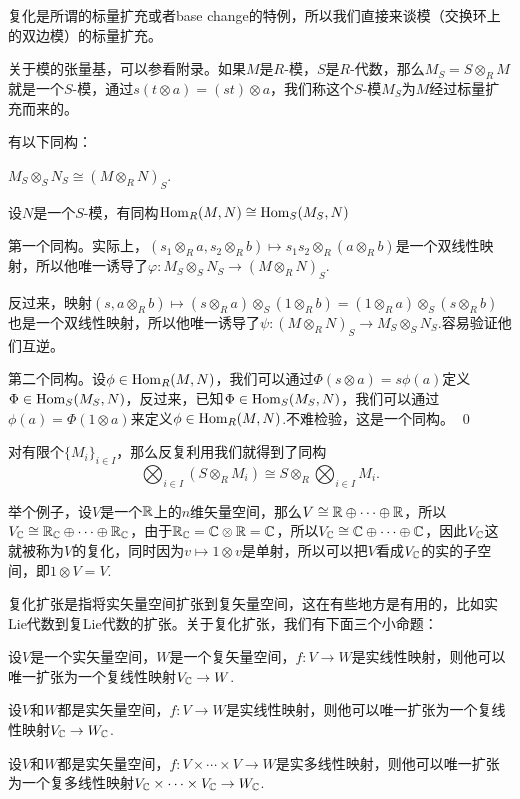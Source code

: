 复化是所谓的标量扩充或者base change的特例，所以我们直接来谈模（交换环上的双边模）的标量扩充。

\para 关于模的张量基，可以参看附录。如果$M$是$R$-模，$S$是$R$-代数，那么$M_S=S\otimes_R M$就是一个$S$-模，通过$s(t\otimes a)=(st)\otimes a$，我们称这个$S$-模$M_S$为$M$经过标量扩充而来的。

\lem 有以下同构：

 $M_S\otimes_S N_S\cong (M\otimes_R N)_S$.

 设$N$是一个$S$-模，有同构$\operatorname{Hom}_R(M,N)\cong \operatorname{Hom}_S(M_S,N)$

\proof 第一个同构。实际上，$(s_1\otimes_R a,s_2\otimes_R b)\mapsto s_1s_2\otimes_R(a\otimes_R b)$是一个双线性映射，所以他唯一诱导了$\varphi:M_S\otimes_S N_S\to (M\otimes_R N)_S$.

反过来，映射$(s,a\otimes_R b)\mapsto (s\otimes_R a)\otimes_S (1\otimes_R b)=(1\otimes_R a)\otimes_S (s\otimes_R b)$也是一个双线性映射，所以他唯一诱导了$\psi:(M\otimes_R N)_S\to M_S\otimes_S N_S$.容易验证他们互逆。

第二个同构。设$\phi\in \operatorname{Hom}_R(M,N)$，我们可以通过$\Phi(s\otimes a)=s\phi(a)$定义$\Phi\in \operatorname{Hom}_S(M_S,N)$，反过来，已知$\Phi\in \operatorname{Hom}_S(M_S,N)$，我们可以通过$\phi(a)=\Phi(1\otimes a)$来定义$\phi\in \operatorname{Hom}_R(M,N)$.不难检验，这是一个同构。 \qed

对有限个$\{M_i\}_{i\in I}$，那么反复利用我们就得到了同构
\[
\bigotimes_{i\in I} \left(S\otimes_RM_i\right)\cong S\otimes_R\bigotimes_{i\in I} M_i.
\]

\para 举个例子，设$V$是一个$\mathbb{R}$上的$n$维矢量空间，那么$V\cong \mathbb{R}\oplus \cdots \oplus \mathbb{R}$，所以$V_{\mathbb{C}}\cong \mathbb{R}_{\mathbb{C}}\oplus \cdots \oplus \mathbb{R}_{\mathbb{C}}$，由于$\mathbb{R}_{\mathbb{C}}=\mathbb{C}\otimes \mathbb{R}=\mathbb{C}$，所以$V_{\mathbb{C}}\cong \mathbb{C}\oplus \cdots \oplus \mathbb{C}$，因此$V_{\mathbb{C}}$这就被称为$V$的复化，同时因为$v\mapsto 1\otimes v$是单射，所以可以把$V$看成$V_{\mathbb{C}}$的实的子空间，即$1\otimes V=V$.

\para 复化扩张是指将实矢量空间扩张到复矢量空间，这在有些地方是有用的，比如实Lie代数到复Lie代数的扩张。关于复化扩张，我们有下面三个小命题：

设$V$是一个实矢量空间，$W$是一个复矢量空间，$f:V\to W$是实线性映射，则他可以唯一扩张为一个复线性映射$V_{\mathbb{C}}\to W$.

设$V$和$W$都是实矢量空间，$f:V\to W$是实线性映射，则他可以唯一扩张为一个复线性映射$V_{\mathbb{C}}\to W_{\mathbb{C}}$.

设$V$和$W$都是实矢量空间，$f:V\times\cdots\times V\to W$是实多线性映射，则他可以唯一扩张为一个复多线性映射$V_{\mathbb{C}}\times\cdots\times V_{\mathbb{C}}\to W_{\mathbb{C}}$.

